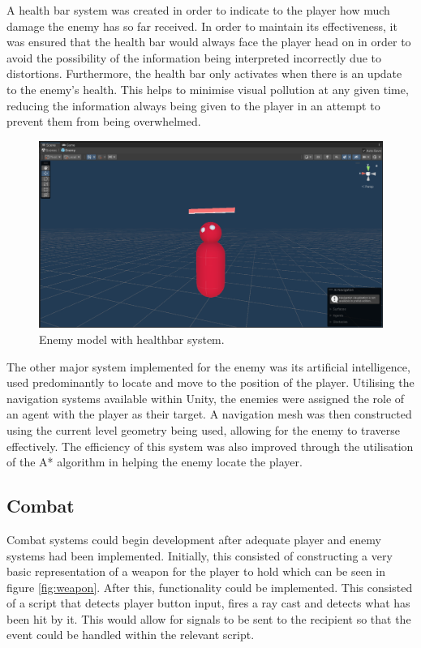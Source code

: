 \documentclass[11pt]{article}
\begin{document}
A health bar system was created in order to indicate to the player how much damage the enemy has so
far received. In order to maintain its effectiveness, it was ensured that the health bar would
always face the player head on in order to avoid the possibility of the information being
interpreted incorrectly due to distortions. Furthermore, the health bar only activates when there
is an update to the enemy’s health. This helps to minimise visual pollution at any given time,
reducing the information always being given to the player in an attempt to prevent them from being
overwhelmed.

\begin{figure}[htb] 
    \centering
    \includegraphics[width=\columnwidth]{enemy}
    \caption{Enemy model with healthbar system.}
    \label{fig:enemy}
\end{figure}

The other major system implemented for the enemy was its artificial intelligence, used
predominantly to locate and move to the position of the player. Utilising the navigation systems
available within Unity, the enemies were assigned the role of an agent with the player as their
target. A navigation mesh was then constructed using the current level geometry being used,
allowing for the enemy to traverse effectively. The efficiency of this system was also improved
through the utilisation of the A* algorithm in helping the enemy locate the player. \\

\subsection{Combat}
Combat systems could begin development after adequate player and enemy systems had been
implemented. Initially, this consisted of constructing a very basic representation of a weapon for
the player to hold which can be seen in figure \ref{fig:weapon}. After this, functionality could be
implemented. This consisted of a script that detects player button input, fires a ray cast and
detects what has been hit by it. This would allow for signals to be sent to the recipient so that
the event could be handled within the relevant script. 
\end{document}
